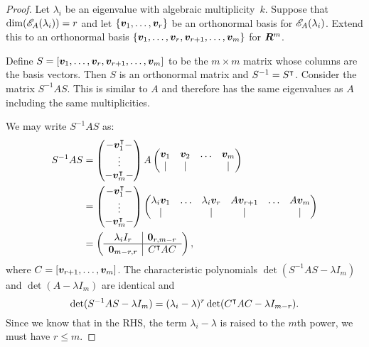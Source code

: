 \begin{proof}
Let $\lambda_i$ be an eigenvalue with algebraic multiplicity~$k$.  Suppose that
$\dim(\mathscr{E}_{A}(\lambda_i)) = r$ and let $\{\boldsymbol{v}_1, \ldots, \boldsymbol{v}_r\}$ be an
orthonormal basis for $\mathscr{E}_{A}(\lambda_i)$.  Extend this to an
orthonormal basis $\{\boldsymbol{v}_1, \ldots, \boldsymbol{v}_r, \boldsymbol{v}_{r + 1}, \ldots, \boldsymbol{v}_m\}$ 
for $\bm{R}^m$. 

Define $S = [\boldsymbol{v}_1, \ldots, \boldsymbol{v}_r, \boldsymbol{v}_{r + 1}, \ldots, \boldsymbol{v}_m]$ 
to be the $m \times m$ matrix whose columns are the basis vectors. 
Then $S$ is an orthonormal matrix and $S^{-1} = S^{\intercal}$. Consider the 
matrix $S^{-1} A S$. This is similar to $A$ and therefore has the 
same eigenvalues as $A$ including the same multiplicities. 

We may write $S^{-1} A S$ as:
\begin{align*}
    S^{-1} A S & = \begin{pmatrix} 
                        -\boldsymbol{v}_1^{\intercal}- \\
                         \vdots \\
                        -\boldsymbol{v}_m^{\intercal}- 
                   \end{pmatrix} 
                   A 
                   \begin{pmatrix}
                    \boldsymbol{v}_1 & \boldsymbol{v}_2 & \ldots & \boldsymbol{v}_m \\
                        |      &    |       &        &    |       
                   \end{pmatrix} \\
              & = \begin{pmatrix} 
                        -\boldsymbol{v}_1^{\intercal}- \\
                         \vdots \\
                        -\boldsymbol{v}_m^{\intercal}- 
                   \end{pmatrix} 
                   \begin{pmatrix}
                    \lambda_i \boldsymbol{v}_1 & \ldots & \lambda_i \boldsymbol{v}_r & A \boldsymbol{v}_{r + 1} & \ldots & A \boldsymbol{v}_m \\
                            |          &        &         |          &          |         &        &     |
                   \end{pmatrix} \\
             & = \left ( \begin{array}{c|c}
                    \lambda_i I_r         & \boldsymbol{0}_{r, m - r} \\ \hline
                    \boldsymbol{0}_{m - r, r} & C^{\intercal} A C 
                 \end{array} \right ),
\end{align*}
where $C = [\boldsymbol{v}_{r + 1}, \ldots, \boldsymbol{v}_m]$. The characteristic polynomials 
$\det (S^{-1} A S - \lambda I_m)$ and $\det (A - \lambda I_m)$ are identical 
and 
\[
   \det (S^{-1} A S - \lambda I_m) = (\lambda_i - \lambda)^r \det (C^{\intercal} A C - \lambda I_{m - r}). 
\]
Since we know that in the RHS, the term $\lambda_i - \lambda$ is raised to the $m$th power, 
we must have $r \leq m$. 
\end{proof}
